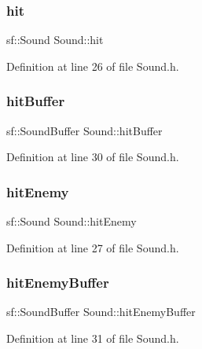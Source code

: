 \subsubsection{\texorpdfstring{hit}{hit}}
{\footnotesize\ttfamily sf\+::\+Sound Sound\+::hit}



Definition at line 26 of file Sound.\+h.

\hypertarget{class_sound_ad68e36ce916f5b858aaf467a6fd929e1}{}\label{class_sound_ad68e36ce916f5b858aaf467a6fd929e1} 
\subsubsection{\texorpdfstring{hit\+Buffer}{hitBuffer}}
{\footnotesize\ttfamily sf\+::\+Sound\+Buffer Sound\+::hit\+Buffer}



Definition at line 30 of file Sound.\+h.

\hypertarget{class_sound_aca883eb04a7aa8844095afd7d397976a}{}\label{class_sound_aca883eb04a7aa8844095afd7d397976a} 
\subsubsection{\texorpdfstring{hit\+Enemy}{hitEnemy}}
{\footnotesize\ttfamily sf\+::\+Sound Sound\+::hit\+Enemy}



Definition at line 27 of file Sound.\+h.

\hypertarget{class_sound_a5a2a2ccabe0099ebf4c8fc3cbb8edff6}{}\label{class_sound_a5a2a2ccabe0099ebf4c8fc3cbb8edff6} 
\subsubsection{\texorpdfstring{hit\+Enemy\+Buffer}{hitEnemyBuffer}}
{\footnotesize\ttfamily sf\+::\+Sound\+Buffer Sound\+::hit\+Enemy\+Buffer}



Definition at line 31 of file Sound.\+h.

\hypertarget{class_sound_a49188be0a133d32388a600764aee8959}{}\label{class_sound_a49188be0a133d32388a600764aee8959} 
